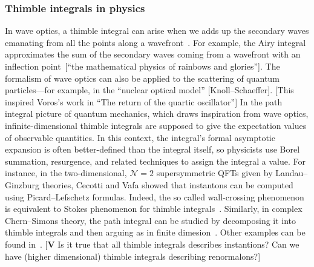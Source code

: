\documentclass{article}
\theoremstyle{definition}
\theoremstyle{plain}
\newenvironment{todo}{\color{Coral}}{\color{black}}
\begin{document}
\subsubsection{Thimble integrals in physics}
In wave optics, a thimble integral can arise when we adds up the secondary waves emanating from all the points along a wavefront~\cite{Fenyes-ihes-lecture}. For example, the Airy integral approximates the sum of the secondary waves coming from a wavefront with an inflection point~\begin{todo}[``the mathematical physics of rainbows and glories'']\end{todo}. \begin{todo}The formalism of wave optics can also be applied to the scattering of quantum particles---for example, in the ``nuclear optical model'' [Knoll--Schaeffer]. [This inspired Voros's work in ``The return of the quartic oscillator'']\end{todo} In the path integral picture of quantum mechanics, which draws inspiration from wave optics, infinite-dimensional thimble integrals are supposed to give the expectation values of observable quantities. In this context, the integral's formal asymptotic expansion is often better-defined than the integral itself, so physicists use Borel summation, resurgence, and related techniques to assign the integral a value. For instance, in the two-dimensional, $\mathcal{N}=2$ supersymmetric QFTs given by Landau--Ginzburg theories, Cecotti and Vafa showed that instantons can be computed using Picard--Lefschetz formulas. Indeed, the so called wall-crossing phenomenon is equivalent to Stokes phenomenon for thimble integrals~\cite{Cecotti:1992rm}. Similarly, in complex Chern--Simons theory, the path integral can be studied by decomposing it into thimble integrals and then arguing as in finite dimesion~\cite{gukov-marino-purtrov-resurgence,Witten}. Other examples can be found in~\cite{costin_kruskal,Garoufalidis--CS,GTM--CS,GGM,dunne-unsal2,dunne-unsal,Fauvet_Menous_Queva,Tanizaki:2014tua,Berry_Howls,Berry1991,Howls97,Howls,pham1988resurgence,Unsal--resurgence-gauge}. \begin{todo}[\textbf{V} Is it true that all thimble integrals describes instantions? Can we have (higher dimensional) thimble integrals describing renormalons?]\end{todo}
%
\end{document}
